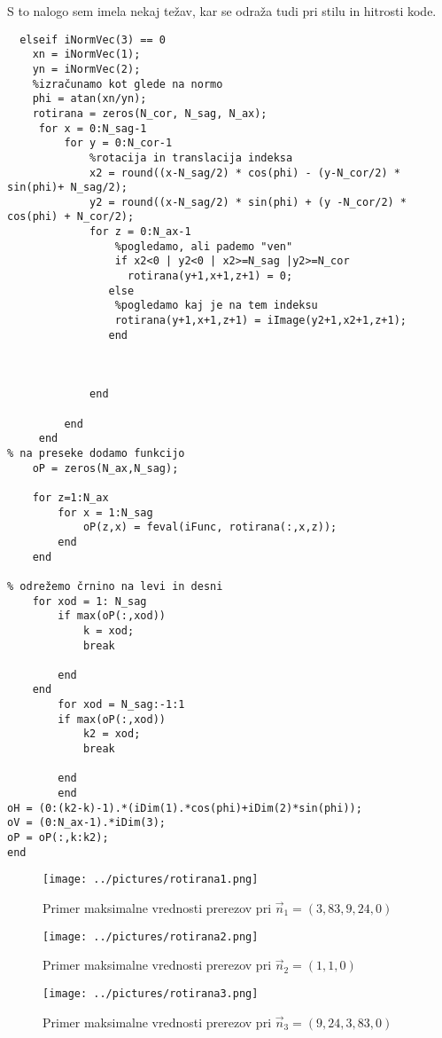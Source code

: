 \documentclass[12pt,a4paper]{article}
\begin{document}
S to nalogo sem imela nekaj težav, kar se odraža tudi pri stilu in hitrosti kode. 
\begin{verbatim}
  elseif iNormVec(3) == 0
    xn = iNormVec(1);
    yn = iNormVec(2);
    %izračunamo kot glede na normo
    phi = atan(xn/yn);
    rotirana = zeros(N_cor, N_sag, N_ax);
     for x = 0:N_sag-1
         for y = 0:N_cor-1
             %rotacija in translacija indeksa
             x2 = round((x-N_sag/2) * cos(phi) - (y-N_cor/2) * sin(phi)+ N_sag/2);
             y2 = round((x-N_sag/2) * sin(phi) + (y -N_cor/2) * cos(phi) + N_cor/2);
             for z = 0:N_ax-1
                 %pogledamo, ali pademo "ven"
                 if x2<0 | y2<0 | x2>=N_sag |y2>=N_cor
                   rotirana(y+1,x+1,z+1) = 0;
                else
                 %pogledamo kaj je na tem indeksu
                 rotirana(y+1,x+1,z+1) = iImage(y2+1,x2+1,z+1);
                end
                     
                
                
             end
                 
         end
     end
% na preseke dodamo funkcijo
    oP = zeros(N_ax,N_sag);

    for z=1:N_ax
        for x = 1:N_sag
            oP(z,x) = feval(iFunc, rotirana(:,x,z));
        end
    end
    
% odrežemo črnino na levi in desni
    for xod = 1: N_sag
        if max(oP(:,xod))
            k = xod;
            break
           
        end
    end
        for xod = N_sag:-1:1
        if max(oP(:,xod))
            k2 = xod;
            break
           
        end
        end
oH = (0:(k2-k)-1).*(iDim(1).*cos(phi)+iDim(2)*sin(phi));
oV = (0:N_ax-1).*iDim(3);
oP = oP(:,k:k2);
end
\end{verbatim}
\begin{figure}[h!]
  \begin{center}
    \texttt{[image: ../pictures/rotirana1.png]}
    \caption{Primer maksimalne vrednosti prerezov pri $\vec{n}_1 = (3,83, 9,24, 0)$}
  \end{center}
\end{figure}
\pagebreak
\begin{figure}[h!]
  \begin{center}
    \texttt{[image: ../pictures/rotirana2.png]}
    \caption{Primer maksimalne vrednosti prerezov pri $\vec{n}_2 = (1, 1, 0)$}
  \end{center}
\end{figure}
\begin{figure}[h!]
  \begin{center}
    \texttt{[image: ../pictures/rotirana3.png]}
    \caption{Primer maksimalne vrednosti prerezov pri $\vec{n}_3 = (9,24, 3,83, 0)$}
  \end{center}
\end{figure}
\pagebreak
\end{document}
